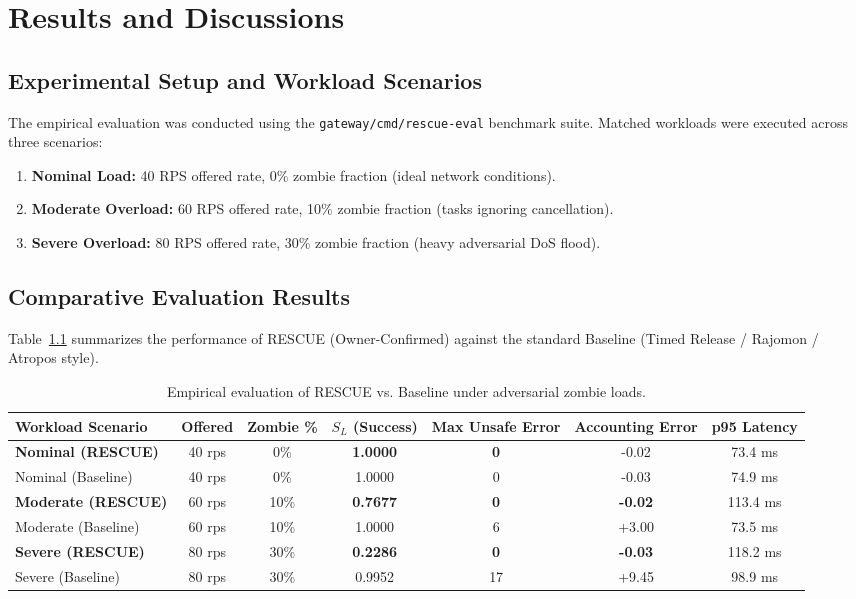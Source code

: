 \documentclass[12pt,a4paper]{report}
\begin{document}
\chapter{Results and Discussions}

\section{Experimental Setup and Workload Scenarios}
The empirical evaluation was conducted using the \texttt{gateway/cmd/rescue-eval} benchmark suite. Matched workloads were executed across three scenarios:
\begin{enumerate}
    \item \textbf{Nominal Load:} 40 RPS offered rate, 0\% zombie fraction (ideal network conditions).
    \item \textbf{Moderate Overload:} 60 RPS offered rate, 10\% zombie fraction (tasks ignoring cancellation).
    \item \textbf{Severe Overload:} 80 RPS offered rate, 30\% zombie fraction (heavy adversarial DoS flood).
\end{enumerate}

\section{Comparative Evaluation Results}
Table~\ref{tab:results} summarizes the performance of RESCUE (Owner-Confirmed) against the standard Baseline (Timed Release / Rajomon / Atropos style).

\begin{table}[H]
\centering
\small
\begin{tabularx}{\textwidth}{l c c c c c c}
\toprule
\textbf{Workload Scenario} & \textbf{Offered} & \textbf{Zombie \%} & \textbf{$S_L$ (Success)} & \textbf{Max Unsafe Error} & \textbf{Accounting Error} & \textbf{p95 Latency} \\
\midrule
\textbf{Nominal (RESCUE)} & 40 rps & 0\% & \textbf{1.0000} & \textbf{0} & -0.02 & 73.4 ms \\
Nominal (Baseline) & 40 rps & 0\% & 1.0000 & 0 & -0.03 & 74.9 ms \\
\midrule
\textbf{Moderate (RESCUE)} & 60 rps & 10\% & \textbf{0.7677} & \textbf{0} & \textbf{-0.02} & 113.4 ms \\
Moderate (Baseline) & 60 rps & 10\% & 1.0000 & 6 & +3.00 & 73.5 ms \\
\midrule
\textbf{Severe (RESCUE)} & 80 rps & 30\% & \textbf{0.2286} & \textbf{0} & \textbf{-0.03} & 118.2 ms \\
Severe (Baseline) & 80 rps & 30\% & 0.9952 & 17 & +9.45 & 98.9 ms \\
\bottomrule
\end{tabularx}
\caption{Empirical evaluation of RESCUE vs. Baseline under adversarial zombie loads.}
\label{tab:results}
\end{table}
\end{document}
